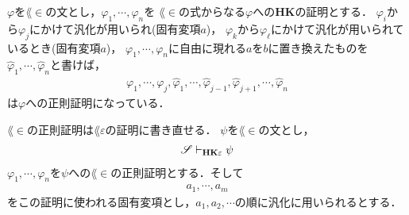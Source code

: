\begin{metaprf}
		$\varphi$を$\lang{\in}$の文とし，$\varphi_{1},\cdots,\varphi_{n}$を
		$\lang{\in}$の式からなる$\varphi$への{\bf HK}の証明とする．
		$\varphi_{i}$から$\varphi_{j}$にかけて汎化が用いられ(固有変項$a$)，
		$\varphi_{k}$から$\varphi_{\ell}$にかけて汎化が用いられているとき(固有変項$a$)，
		$\varphi_{1},\cdots,\varphi_{n}$に自由に現れる$a$を$b$に置き換えたものを
		$\hat{\varphi}_{1},\cdots,\hat{\varphi}_{n}$と書けば，
		\begin{align}
			\varphi_{1},\cdots,\varphi_{j},
			\hat{\varphi}_{1},\cdots,\hat{\varphi}_{j-1},\hat{\varphi}_{j+1},
			\cdots,\hat{\varphi}_{n}
		\end{align}
		は$\varphi$への正則証明になっている．
		\QED
	\end{metaprf}
	
	$\lang{\in}$の正則証明は$\lang{\varepsilon}$の証明に書き直せる．
	$\psi$を$\lang{\in}$の文とし，
	\begin{align}
		\mathscr{S} \vdash_{{\scriptsize \mbox{{\bf HK$\varepsilon$}}}} \psi
	\end{align}
	$\varphi_{1},\cdots,\varphi_{n}$を$\psi$への$\lang{\in}$の正則証明とする．そして
	\begin{align}
		a_{1},\cdots,a_{m}
	\end{align}
	をこの証明に使われる固有変項とし，$a_{1},a_{2},\cdots$の順に汎化に用いられるとする．
	
